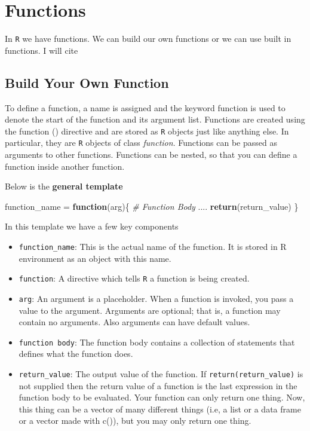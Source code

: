 \documentclass[
]{book}
\newenvironment{Shaded}{\begin{snugshade}}{\end{snugshade}}
\newcommand{\CommentTok}[1]{\textcolor[rgb]{0.56,0.35,0.01}{\textit{#1}}}
\newcommand{\ControlFlowTok}[1]{\textcolor[rgb]{0.13,0.29,0.53}{\textbf{#1}}}
\newcommand{\KeywordTok}[1]{\textcolor[rgb]{0.13,0.29,0.53}{\textbf{#1}}}
\newcommand{\NormalTok}[1]{#1}
\newcommand{\StringTok}[1]{\textcolor[rgb]{0.31,0.60,0.02}{#1}}
\providecommand{\tightlist}{%
  \setlength{\itemsep}{0pt}\setlength{\parskip}{0pt}}
\begin{document}
\hypertarget{functions}{%
\chapter{Functions}\label{functions}}

In \texttt{R} we have functions. We can build our own functions or we can use built in functions. I will cite \citet{r-func} \citet{dummies2015}

\hypertarget{build-your-own-function}{%
\section{Build Your Own Function}\label{build-your-own-function}}

To define a function, a name is assigned and the keyword function is used to denote the start of the function and its argument list. Functions are created using the function () directive and are stored as \texttt{R} objects just like anything else. In particular, they are \texttt{R} objects of class \emph{function}. Functions can be passed as arguments to other functions. Functions can be nested, so that you can define a function inside another function.

Below is the \textbf{general template}

\begin{Shaded}
\begin{Highlighting}[]
\NormalTok{function_name =}\StringTok{ }\ControlFlowTok{function}\NormalTok{(arg)\{}
  \CommentTok{# Function Body }
\NormalTok{  ....}
  \KeywordTok{return}\NormalTok{(return_value)}
\NormalTok{\}}
\end{Highlighting}
\end{Shaded}

In this template we have a few key components

\begin{itemize}
\tightlist
\item
  \texttt{function\_name}: This is the actual name of the function. It is stored in R environment as an object with this name.
\item
  \texttt{function}: A directive which tells \texttt{R} a function is being created.
\item
  \texttt{arg}: An argument is a placeholder. When a function is invoked, you pass a value to the argument. Arguments are optional; that is, a function may contain no arguments. Also arguments can have default values.
\item
  \texttt{function\ body}: The function body contains a collection of statements that defines what the function does.
\item
  \texttt{return\_value}: The output value of the function. If \texttt{return(return\_value)} is not supplied then the return value of a function is the last expression in the function body to be evaluated. Your function can only return one thing. Now, this thing can be a vector of many different things
  (i.e, a list or a data frame or a vector made with c()), but you may only return one thing.
\end{itemize}
\end{document}
